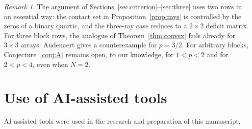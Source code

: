 \documentclass[11pt]{amsart}
\theoremstyle{definition}
\theoremstyle{remark}
\newtheorem{remark}[theorem]{Remark}
\numberwithin{equation}{section}
\begin{document}
\begin{remark}
The argument of Sections~\ref{sec:criterion}--\ref{sec:three} uses two rows in an essential way: the contact set in Proposition~\ref{prop:rays} is controlled by the zeros of a binary quartic, and the three-ray case reduces to a $2\times2$ deficit matrix. For three block rows, the analogue of Theorem~\ref{thm:convex} fails already for $3\times3$ arrays: Audenaert \cite[Section~5]{Aud08} gives a counterexample for $p=3/2$. For arbitrary blocks, Conjecture~\ref{conj:A} remains open, to our knowledge, for $1<p<2$ and for $2<p<4$, even when $N=2$.
\end{remark}

\enlargethispage{5\baselineskip}

\section*{Use of AI-assisted tools}

AI-assisted tools were used in the research and preparation of this manuscript.
\end{document}
